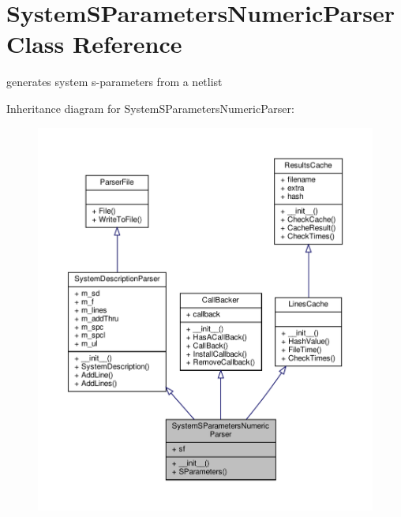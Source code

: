 \hypertarget{classSignalIntegrity_1_1Parsers_1_1SystemSParametersParser_1_1SystemSParametersNumericParser}{}\section{System\+S\+Parameters\+Numeric\+Parser Class Reference}
\label{classSignalIntegrity_1_1Parsers_1_1SystemSParametersParser_1_1SystemSParametersNumericParser}


generates system s-\/parameters from a netlist  




Inheritance diagram for System\+S\+Parameters\+Numeric\+Parser\+:\nopagebreak
\begin{figure}[H]
\begin{center}
\leavevmode
\includegraphics[width=350pt]{classSignalIntegrity_1_1Parsers_1_1SystemSParametersParser_1_1SystemSParametersNumericParser__inherit__graph}
\end{center}
\end{figure}


